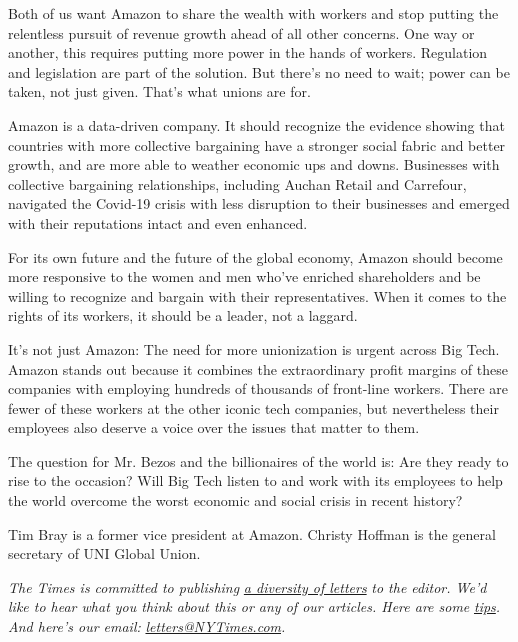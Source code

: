 Both of us want Amazon to share the wealth with workers and stop putting
the relentless pursuit of revenue growth ahead of all other concerns.
One way or another, this requires putting more power in the hands of
workers. Regulation and legislation are part of the solution. But
there's no need to wait; power can be taken, not just given. That's what
unions are for.

Amazon is a data-driven company. It should recognize the evidence
showing that countries with more collective bargaining have a stronger
social fabric and better growth, and are more able to weather economic
ups and downs. Businesses with collective bargaining relationships,
including Auchan Retail and Carrefour, navigated the Covid-19 crisis
with less disruption to their businesses and emerged with their
reputations intact and even enhanced.

For its own future and the future of the global economy, Amazon should
become more responsive to the women and men who've enriched shareholders
and be willing to recognize and bargain with their representatives. When
it comes to the rights of its workers, it should be a leader, not a
laggard.

It's not just Amazon: The need for more unionization is urgent across
Big Tech. Amazon stands out because it combines the extraordinary profit
margins of these companies with employing hundreds of thousands of
front-line workers. There are fewer of these workers at the other iconic
tech companies, but nevertheless their employees also deserve a voice
over the issues that matter to them.

The question for Mr. Bezos and the billionaires of the world is: Are
they ready to rise to the occasion? Will Big Tech listen to and work
with its employees to help the world overcome the worst economic and
social crisis in recent history?

Tim Bray is a former vice president at Amazon. Christy Hoffman is the
general secretary of UNI Global Union.

\emph{The Times is committed to publishing}
\href{https://www.nytimes3xbfgragh.onion/2019/01/31/opinion/letters/letters-to-editor-new-york-times-women.html}{\emph{a
diversity of letters}} \emph{to the editor. We'd like to hear what you
think about this or any of our articles. Here are some}
\href{https://help.nytimes3xbfgragh.onion/hc/en-us/articles/115014925288-How-to-submit-a-letter-to-the-editor}{\emph{tips}}\emph{.
And here's our email:}
\href{mailto:letters@NYTimes.com}{\emph{letters@NYTimes.com}}\emph{.}

